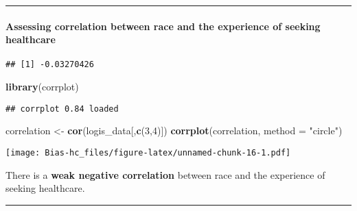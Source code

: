 \documentclass[]{article}
\newenvironment{Shaded}{\begin{snugshade}}{\end{snugshade}}
\newcommand{\DataTypeTok}[1]{\textcolor[rgb]{0.13,0.29,0.53}{#1}}
\newcommand{\DecValTok}[1]{\textcolor[rgb]{0.00,0.00,0.81}{#1}}
\newcommand{\KeywordTok}[1]{\textcolor[rgb]{0.13,0.29,0.53}{\textbf{#1}}}
\newcommand{\NormalTok}[1]{#1}
\newcommand{\OperatorTok}[1]{\textcolor[rgb]{0.81,0.36,0.00}{\textbf{#1}}}
\newcommand{\StringTok}[1]{\textcolor[rgb]{0.31,0.60,0.02}{#1}}
\let\oldparagraph\paragraph
\renewcommand{\paragraph}[1]{\oldparagraph{#1}\mbox{}}
\begin{document}
\begin{center}\rule{0.5\linewidth}{\linethickness}\end{center}

\hypertarget{assessing-correlation-between-race-and-the-experience-of-seeking-healthcare}{%
\paragraph{Assessing correlation between race and the experience of
seeking
healthcare}\label{assessing-correlation-between-race-and-the-experience-of-seeking-healthcare}}

\begin{Shaded}
\end{Shaded}

\begin{verbatim}
## [1] -0.03270426
\end{verbatim}

\begin{Shaded}
\begin{Highlighting}[]
\KeywordTok{library}\NormalTok{(corrplot)}
\end{Highlighting}
\end{Shaded}

\begin{verbatim}
## corrplot 0.84 loaded
\end{verbatim}

\begin{Shaded}
\begin{Highlighting}[]
\NormalTok{correlation <-}\StringTok{ }\KeywordTok{cor}\NormalTok{(logis_data[,}\KeywordTok{c}\NormalTok{(}\DecValTok{3}\NormalTok{,}\DecValTok{4}\NormalTok{)])}
\KeywordTok{corrplot}\NormalTok{(correlation, }\DataTypeTok{method =} \StringTok{"circle"}\NormalTok{)}
\end{Highlighting}
\end{Shaded}

\texttt{[image: Bias-hc\_files/figure-latex/unnamed-chunk-16-1.pdf]}

There is a \textbf{weak negative correlation} between race and the
experience of seeking healthcare.

\begin{center}\rule{0.5\linewidth}{\linethickness}\end{center}
\end{document}
